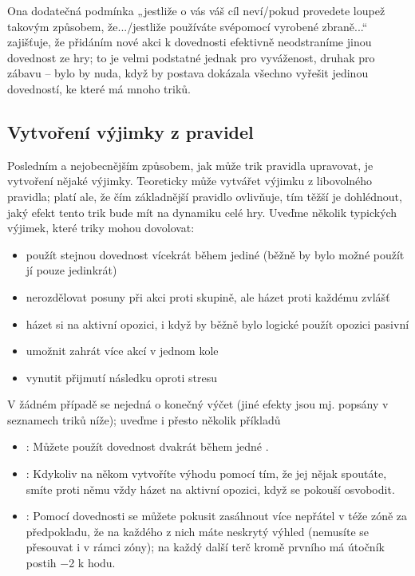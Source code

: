 \documentclass[../main.tex]{subfiles}
\begin{document}
Ona dodatečná podmínka „jestliže o vás váš cíl neví/pokud provedete loupež takovým způsobem, že.../jestliže používáte svépomocí vyrobené zbraně...“ zajišťuje, že přidáním nové akci k dovednosti efektivně neodstraníme jinou dovednost ze hry; to je velmi podstatné jednak pro vyváženost, druhak pro zábavu – bylo by nuda, když by postava dokázala všechno vyřešit jedinou dovedností, ke které má mnoho triků.

\subsection{Vytvoření výjimky z pravidel}
\label{sec:trik-vyjimky}
Posledním a nejobecnějším způsobem, jak může trik pravidla upravovat, je vytvoření nějaké výjimky. Teoreticky může vytvářet výjimku z libovolného pravidla; platí ale, že čím základnější pravidlo ovlivňuje, tím těžší je dohlédnout, jaký efekt tento trik bude mít na dynamiku celé hry. Uveďme několik typických výjimek, které triky mohou dovolovat:

\begin{itemize}
\item použít stejnou dovednost vícekrát během jediné  (běžně by bylo možné použít jí pouze jedinkrát)
\item nerozdělovat posuny při akci proti skupině, ale házet proti každému zvlášť
\item házet si na aktivní opozici, i když by běžně bylo logické použít opozici pasivní
\item umožnit zahrát více akcí v jednom kole
\item vynutit přijmutí následku oproti stresu
\end{itemize}

V žádném případě se nejedná o konečný výčet (jiné efekty jsou mj. popsány v seznamech triků níže); uveďme i přesto několik příkladů

\begin{itemize}
\item {}:
  Můžete použít dovednost  dvakrát během jedné .
\item {}:
  Kdykoliv na někom vytvoříte výhodu pomocí  tím, že jej nějak spoutáte, smíte proti němu vždy házet na aktivní opozici, když se pokouší osvobodit.
\item {}:
  Pomocí dovednosti  se můžete pokusit zasáhnout více nepřátel v téže zóně za předpokladu, že na každého z nich máte neskrytý výhled (nemusíte se přesouvat i v rámci zóny); na každý další terč kromě prvního má útočník postih −2 k hodu.
\end{itemize}
\end{document}

